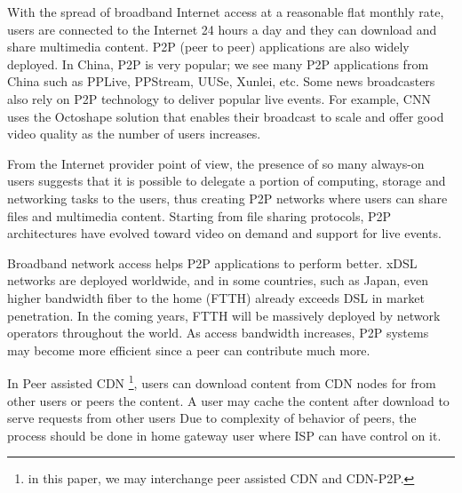 \documentclass[JIP]{ipsj}
\begin{document}
With the spread of broadband Internet access at a reasonable flat monthly rate, users are connected to the Internet 24 hours a day and they can download and share multimedia content.  
P2P (peer to peer) applications are also widely deployed.  
In China, P2P is very popular; we see many P2P applications from China such as PPLive, PPStream, UUSe, Xunlei, etc.  
Some news broadcasters also rely on P2P technology to deliver popular live events.  
For example, CNN uses the Octoshape solution that enables their broadcast to scale and offer good video quality as the number of users increases.

From the Internet provider point of view, the presence of so many always-on users suggests that it is possible to delegate a portion of computing, storage and networking tasks to the users, thus creating P2P networks where users can share files and multimedia content.
Starting from file sharing protocols, P2P architectures have evolved toward video on demand and support for live events.

Broadband network access helps P2P applications to perform better.
xDSL networks are deployed worldwide, and in some countries, such as Japan, even higher bandwidth fiber to the home (FTTH) already exceeds DSL in market penetration.  In the coming years, FTTH will be massively deployed by network operators throughout the world.  
As access bandwidth increases, P2P systems may become more efficient since a peer can contribute much more.

In Peer assisted CDN \footnote{in this paper, we may interchange peer assisted CDN and CDN-P2P.}, users can download content from CDN nodes for from other users or peers the content.
A user may cache the content after download to serve requests from other users
Due to complexity of behavior of peers, the process should be done in home gateway user where ISP can have control on it. 
\end{document}
